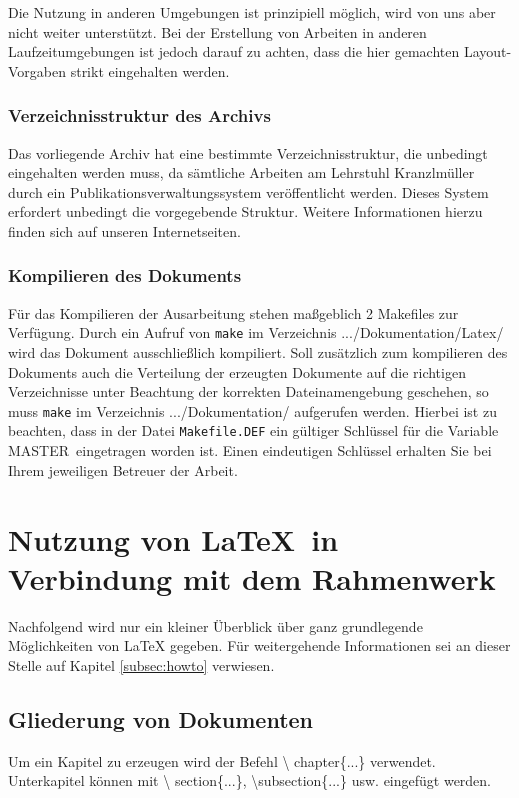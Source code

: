 Die Nutzung in anderen Umgebungen ist prinzipiell möglich, wird von
uns aber nicht weiter unterstützt. Bei der Erstellung von Arbeiten in
anderen Laufzeitumgebungen ist jedoch darauf zu achten, dass die hier
gemachten Layout-Vorgaben strikt eingehalten werden.

\subsubsection{Verzeichnisstruktur des Archivs}
Das vorliegende Archiv hat eine bestimmte Verzeichnisstruktur, die
unbedingt eingehalten werden muss, da sämtliche Arbeiten am Lehrstuhl
Kranzlmüller durch ein Publikationsverwaltungssystem veröffentlicht
werden. Dieses System erfordert unbedingt die vorgegebende
Struktur. Weitere Informationen hierzu finden sich auf unseren
Internetseiten.

\subsubsection{Kompilieren des Dokuments}
Für das Kompilieren der Ausarbeitung stehen maßgeblich 2 Makefiles zur
Verfügung. Durch ein Aufruf von \texttt{make} im Verzeichnis
.../Dokumentation/Latex/ wird das Dokument ausschließlich
kompiliert. Soll zusätzlich zum kompilieren des Dokuments auch die
Verteilung der erzeugten Dokumente auf die richtigen Verzeichnisse
unter Beachtung der korrekten Dateinamengebung geschehen, so muss
\texttt{make} im Verzeichnis .../Dokumentation/ aufgerufen
werden. Hierbei ist zu beachten, dass in der Datei
\texttt{Makefile.DEF} ein gültiger Schlüssel für die Variable \glqq
MASTER\grqq\ eingetragen worden ist. Einen eindeutigen Schlüssel
erhalten Sie bei Ihrem jeweiligen Betreuer der Arbeit.


\section{Nutzung von \LaTeX\ in Verbindung mit dem Rahmenwerk} 
\label{sec:nutzung}
Nachfolgend wird nur ein kleiner Überblick über ganz grundlegende
Möglichkeiten von \LaTeX \index{\LaTeX} gegeben. Für weitergehende
Informationen sei an dieser Stelle auf Kapitel \ref{subsec:howto}
verwiesen.


\subsection{Gliederung von Dokumenten}
Um ein Kapitel zu erzeugen wird der Befehl \textbackslash
chapter\{...\} verwendet. Unterkapitel können mit \textbackslash
section\{...\}, \textbackslash subsection\{...\} usw. eingefügt
werden.

